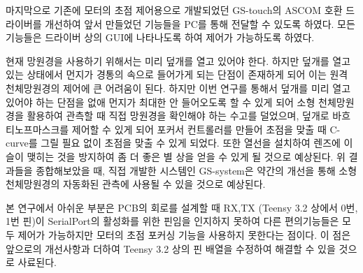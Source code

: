 마지막으로 기존에 모터의 초점 제어용으로 개발되었던 GS-touch의 ASCOM 호환 드라이버를 개선하여 앞서 만들었던 기능들을 PC를 통해 전달할 수 있도록 하였다. 모든 기능들은 드라이버 상의 GUI에 나타나도록 하여 제어가 가능하도록 하였다.


현재 망원경을 사용하기 위해서는 미리 덮개를 열고 있어야 한다. 하지만 덮개를 열고 있는 상태에서 먼지가 경통의 속으로 들어가게 되는 단점이 존재하게 되어 이는 원격 천체망원경의 제어에 큰 어려움이 된다. 하지만 이번 연구를 통해서 덮개를 미리 열고 있어야 하는 단점을 없애 먼지가 최대한 안 들어오도록 할 수 있게 되어 소형 천체망원경을 활용하여 관측할 때 직접 망원경을 확인해야 하는 수고를 덜었으며, 덮개로 바흐티노프마스크를 제어할 수 있게 되어 포커서 컨트롤러를 만들어 초점을 맞출 때 C-curve를 그릴 필요 없이 초점을 맞출 수 있게 되었다. 또한 열선을 설치하여 렌즈에 이슬이 맺히는 것을 방지하여 좀 더 좋은 별 상을 얻을 수 있게 될 것으로 예상된다. 위 결과들을 종합해보았을 때, 직접 개발한 시스템인 GS-system은 약간의 개선을 통해 소형 천체망원경의 자동화된 관측에 사용될 수 있을 것으로 예상된다.


본 연구에서 아쉬운 부분은 PCB의 회로를 설계할 때 RX,TX (Teensy 3.2 상에서 0번, 1번 핀)이 SerialPort의 활성화를 위한 핀임을 인지하지 못하여 다른 편의기능들은 모두 제어가 가능하지만 모터의 초점 포커싱 기능을 사용하지 못한다는 점이다. 이 점은 앞으로의 개선사항과 더하여 Teensy 3.2 상의 핀 배열을 수정하여 해결할 수 있을 것으로 사료된다.
